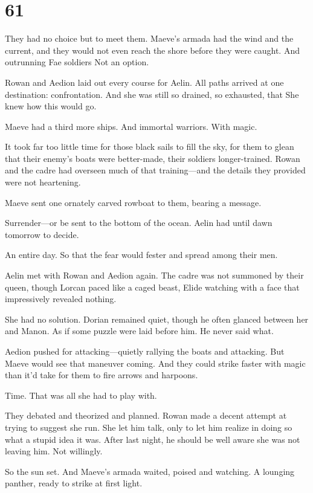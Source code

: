 
\chapter{61}

They had no choice but to meet them. Maeve's armada had the wind and the current, and they would not even reach the shore before they were caught. And outrunning Fae soldiers  Not an option.

Rowan and Aedion laid out every course for Aelin. All paths arrived at one destination: confrontation. And she was still so drained, so exhausted, that  She knew how this would go.

Maeve had a third more ships. And immortal warriors. With magic.

It took far too little time for those black sails to fill the sky, for them to glean that their enemy's boats were better-made, their soldiers longer-trained. Rowan and the cadre had overseen much of that training---and the details they provided were not heartening.

Maeve sent one ornately carved rowboat to them, bearing a message.

Surrender---or be sent to the bottom of the ocean. Aelin had until dawn tomorrow to decide.

An entire day. So that the fear would fester and spread among their men.

Aelin met with Rowan and Aedion again. The cadre was not summoned by their queen, though Lorcan paced like a caged beast, Elide watching with a face that impressively revealed nothing.

She had no solution. Dorian remained quiet, though he often glanced between her and Manon. As if some puzzle were laid before him. He never said what.

Aedion pushed for attacking---quietly rallying the boats and attacking. But Maeve would see that maneuver coming. And they could strike faster with magic than it'd take for them to fire arrows and harpoons.

Time. That was all she had to play with.

They debated and theorized and planned. Rowan made a decent attempt at trying to suggest she run. She let him talk, only to let him realize in doing so what a stupid idea it was. After last night, he should be well aware she was not leaving him. Not willingly.

So the sun set. And Maeve's armada waited, poised and watching. A lounging panther, ready to strike at first light.

